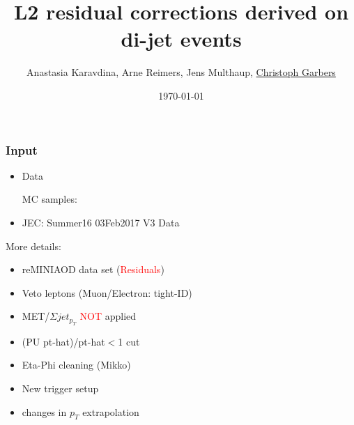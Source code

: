 \documentclass[t,compress]{beamer}
\title[L2 residual corrections]{L2 residual corrections derived on di-jet events}
\author[CHristoph Garbers]{Anastasia Karavdina, Arne Reimers, Jens Multhaup, \underline{Christoph Garbers}}
\institute[UHH]{University of Hamburg}
\date{\today}
\begin{document}
\begin{frame}
 \titlepage
\end{frame}

 \begin{frame}
  \frametitle{Input}
  \begin{itemize}
   \item Data
   \begin{itemize}
  \end{itemize}
   MC samples:
    \begin{itemize}
    \end{itemize}
  \item JEC: Summer16 03Feb2017 V3 Data
  \end{itemize}

More details:
\begin{itemize}
\item reMINIAOD data set (\textcolor{red}{Residuals})
\item Veto leptons (Muon/Electron: tight-ID)
\item MET/$\Sigma jet_{p_T}$ \textcolor{red}{NOT} applied 
\item (PU pt-hat)/pt-hat$<$1 cut
\item Eta-Phi cleaning (Mikko)
\item New trigger setup
\item changes in $p_T$ extrapolation
 \end{itemize}
 \end{frame}
 
\end{document}
